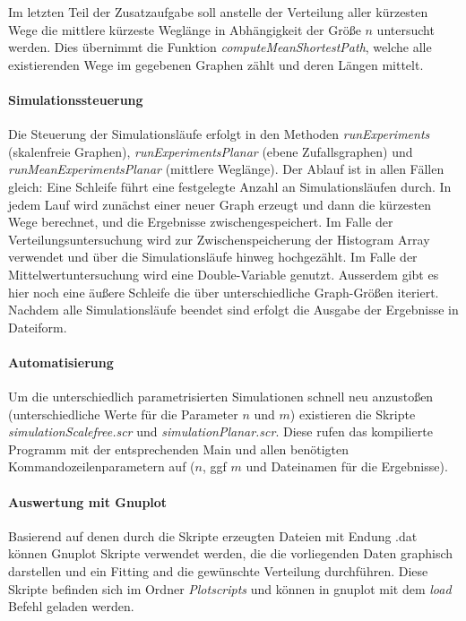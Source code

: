 \documentclass[10pt]{article}
\begin{document}
Im letzten Teil der Zusatzaufgabe soll anstelle der Verteilung aller kürzesten Wege die mittlere kürzeste Weglänge in Abhängigkeit der Größe $n$ untersucht werden. Dies übernimmt die Funktion \textit{computeMeanShortestPath}, welche alle existierenden Wege im gegebenen Graphen zählt und deren Längen mittelt.

\paragraph{Simulationssteuerung}
Die Steuerung der Simulationsläufe erfolgt in den Methoden \textit{runExperiments} (skalenfreie Graphen), \textit{runExperimentsPlanar} (ebene Zufallsgraphen) und \textit{runMeanExperimentsPlanar} (mittlere Weglänge). Der Ablauf ist in allen Fällen gleich: Eine Schleife führt eine festgelegte Anzahl an Simulationsläufen durch. In jedem Lauf wird zunächst einer neuer Graph erzeugt und dann die kürzesten Wege berechnet, und die Ergebnisse zwischengespeichert. Im Falle der Verteilungsuntersuchung wird zur Zwischenspeicherung der Histogram Array verwendet und über die Simulationsläufe hinweg hochgezählt. Im Falle der Mittelwertuntersuchung wird eine Double-Variable genutzt. Ausserdem gibt es hier noch eine äußere Schleife die über unterschiedliche Graph-Größen iteriert. Nachdem alle Simulationsläufe beendet sind erfolgt die Ausgabe der Ergebnisse in Dateiform.

\paragraph{Automatisierung}
Um die unterschiedlich parametrisierten Simulationen schnell neu anzustoßen (unterschiedliche Werte für die Parameter $n$ und $m$) existieren die Skripte \textit{simulationScalefree.scr} und \textit{simulationPlanar.scr}. Diese rufen das kompilierte Programm mit der entsprechenden Main und allen benötigten Kommandozeilenparametern auf ($n$, ggf $m$ und Dateinamen für die Ergebnisse).

\paragraph{Auswertung mit Gnuplot}
Basierend auf denen durch die Skripte erzeugten Dateien mit Endung .dat können Gnuplot Skripte verwendet werden, die die vorliegenden Daten graphisch darstellen und ein Fitting and die gewünschte Verteilung durchführen. Diese Skripte befinden sich im Ordner \textit{Plotscripts} und können in gnuplot mit dem \textit{load} Befehl geladen werden.
\end{document}
